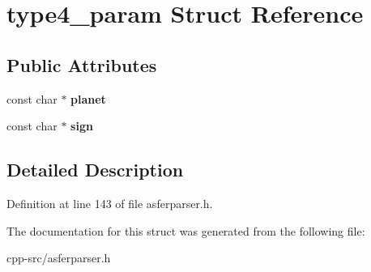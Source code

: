 \hypertarget{structtype4__param}{\section{type4\-\_\-param Struct Reference}
\label{structtype4__param}
}
\subsection*{Public Attributes}
\begin{DoxyCompactItemize}
\item 
\hypertarget{structtype4__param_aa6b27d2d1a5bd3749b7e4e06dbfc5fdc}{const char $\ast$ {\bfseries planet}}\label{structtype4__param_aa6b27d2d1a5bd3749b7e4e06dbfc5fdc}

\item 
\hypertarget{structtype4__param_ad0a1f8f6dfaa93810fcee1b4def8caaa}{const char $\ast$ {\bfseries sign}}\label{structtype4__param_ad0a1f8f6dfaa93810fcee1b4def8caaa}

\end{DoxyCompactItemize}


\subsection{Detailed Description}


Definition at line 143 of file asferparser.\-h.



The documentation for this struct was generated from the following file\-:\begin{DoxyCompactItemize}
\item 
cpp-\/src/asferparser.\-h\end{DoxyCompactItemize}
